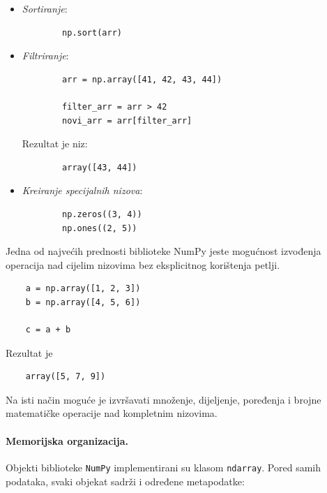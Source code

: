 \begin{itemize}
	\item \textit{Sortiranje}:
	\begin{verbatim}
		np.sort(arr)
	\end{verbatim}
	
	\item \textit{Filtriranje}:
	
	\begin{verbatim}
		arr = np.array([41, 42, 43, 44])
		
		filter_arr = arr > 42
		novi_arr = arr[filter_arr]
	\end{verbatim}
	
	Rezultat je niz:
	
	\begin{verbatim}
		array([43, 44])
	\end{verbatim}
	
	\item \textit{Kreiranje specijalnih nizova}:
	
	\begin{verbatim}
		np.zeros((3, 4))
		np.ones((2, 5))
	\end{verbatim}
	
\end{itemize}


Jedna od najvećih prednosti biblioteke NumPy jeste mogućnost izvođenja operacija nad cijelim nizovima bez eksplicitnog korištenja petlji.

\begin{verbatim}
	a = np.array([1, 2, 3])
	b = np.array([4, 5, 6])
	
	c = a + b
\end{verbatim}

Rezultat je

\begin{verbatim}
	array([5, 7, 9])
\end{verbatim}

Na isti način moguće je izvršavati množenje, dijeljenje, poređenja i brojne matematičke operacije nad kompletnim nizovima.

\paragraph{Memorijska organizacija.} Objekti biblioteke \texttt{NumPy} implementirani su klasom \texttt{ndarray}. Pored samih podataka, svaki objekat sadrži i određene metapodatke:

